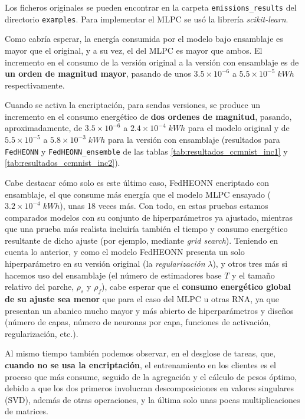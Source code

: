 \documentclass[00-Trabajo_Final.tex]{subfiles}
\begin{document}
Los ficheros originales se pueden encontrar en la carpeta \verb|emissions_results| del directorio \verb|examples|. Para implementar el MLPC se usó la librería \textit{scikit-learn}.

Como cabría esperar, la energía consumida por el modelo bajo ensamblaje es mayor que el original, y a su vez, el del MLPC es mayor que ambos. El incremento en el consumo de la versión original a la versión con ensamblaje es de \textbf{un orden de magnitud mayor}, pasando de unos $3.5\times 10^{-6}$ a $5.5\times 10^{-5}\;kWh$ respectivamente.

Cuando se activa la encriptación, para sendas versiones, se produce un incremento en el consumo energético de \textbf{dos ordenes de magnitud}, pasando, aproximadamente, de $3.5\times 10^{-6}$ a $2.4\times 10^{-4}\;kWh$ para el modelo original y de $5.5\times 10^{-5}$ a $5.8\times 10^{-3}\;kWh$ para la versión con ensamblaje (resultados para \verb|FedHEONN| y \verb|FedHEONN_ensemble| de las tablas \ref{tab:resultados_ccmnist_inc1} y \ref{tab:resultados_ccmnist_inc2}).

Cabe destacar cómo solo es este último caso, FedHEONN encriptado con ensamblaje, el que consume más energía que el modelo MLPC ensayado ($3.2\times 10^{-4}\;kWh$), unas 18 veces más. Con todo, en estas pruebas estamos comparados modelos con su conjunto de hiperparámetros ya ajustado, mientras que una prueba más realista incluiría también el tiempo y consumo energético resultante de dicho ajuste (por ejemplo, mediante \textit{grid search}). Teniendo en cuenta lo anterior, y como el modelo FedHEONN presenta un solo hiperparámetro en su versión original (la \textit{regularización} $\lambda$), y otros tres más si hacemos uso del ensamblaje (el número de estimadores base ${T}$ y el tamaño relativo del parche, ${\rho}_s$ y ${\rho}_f$), cabe esperar que el \textbf{consumo energético global de su ajuste sea menor} que para el caso del MLPC u otras RNA, ya que presentan un abanico mucho mayor y más abierto de hiperparámetros y diseños (número de capas, número de neuronas por capa, funciones de activación, regularización, etc.).

Al mismo tiempo también podemos observar, en el desglose de tareas, que, \textbf{cuando no se usa la encriptación}, el entrenamiento en los clientes es el proceso que más consume, seguido de la agregación y el cálculo de pesos óptimo, debido a que los dos primeros involucran descomposiciones en valores singulares (SVD), además de otras operaciones, y la última solo unas pocas multiplicaciones de matrices.
\end{document}
